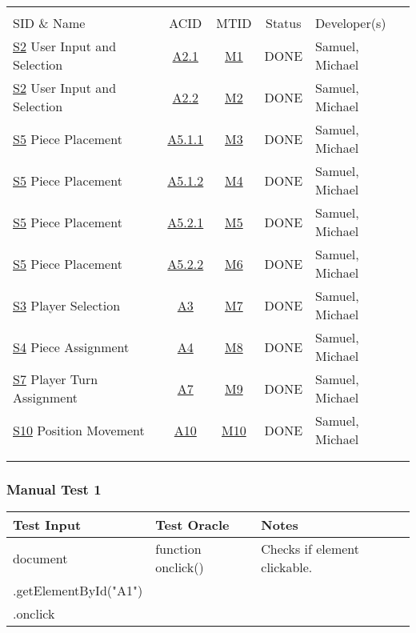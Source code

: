 \documentclass[11pt]{article}
\begin{document}
\begin{center}
\begin{tabular}{|p{4.5cm}|c|c|c|p{3.0cm}|}
 &  &  &  & \\
SID \& Name & ACID & MTID & Status & Developer(s)\\
\hline
\hyperref[sec:org85871bb]{S2} User Input and Selection & \hyperref[sec:orgf5fa540]{A2.1} & \hyperref[sec:orge680701]{M1} & DONE & Samuel, Michael\\
\hyperref[sec:org85871bb]{S2} User Input and Selection & \hyperref[sec:orgf5fa540]{A2.2} & \hyperref[sec:orga26eab6]{M2} & DONE & Samuel, Michael\\
\hyperref[sec:orgdbe2eb7]{S5} Piece Placement & \hyperref[sec:org7397a1b]{A5.1.1} & \hyperref[sec:orgd3f013d]{M3} & DONE & Samuel, Michael\\
\hyperref[sec:orgdbe2eb7]{S5} Piece Placement & \hyperref[sec:org7397a1b]{A5.1.2} & \hyperref[sec:org28f0264]{M4} & DONE & Samuel, Michael\\
\hyperref[sec:orgdbe2eb7]{S5} Piece Placement & \hyperref[sec:org7397a1b]{A5.2.1} & \hyperref[sec:orgcc2fdc0]{M5} & DONE & Samuel, Michael\\
\hyperref[sec:orgdbe2eb7]{S5} Piece Placement & \hyperref[sec:org7397a1b]{A5.2.2} & \hyperref[sec:orgf6e9b19]{M6} & DONE & Samuel, Michael\\
\hyperref[sec:org6661b71]{S3} Player Selection & \hyperref[sec:orgeafb96c]{A3} & \hyperref[sec:org2c6ba93]{M7} & DONE & Samuel, Michael\\
\hyperref[sec:org47fb86d]{S4} Piece Assignment & \hyperref[sec:org421b2d5]{A4} & \hyperref[sec:org76246c2]{M8} & DONE & Samuel, Michael\\
\hyperref[sec:orgf5d0825]{S7} Player Turn Assignment & \hyperref[sec:org6347978]{A7} & \hyperref[sec:orgdfb2713]{M9} & DONE & Samuel, Michael\\
\hyperref[sec:org63225c5]{S10} Position Movement & \hyperref[sec:org8c4c34f]{A10} & \hyperref[sec:orgf6b4157]{M10} & DONE & Samuel, Michael\\
 &  &  &  & \\
 &  &  &  & \\
\end{tabular}
\end{center}
\subsubsection{Manual Test 1}
\label{sec:orge680701}
\begin{center}
\begin{tabular}{|p{6.0cm}|p{4.0cm}|p{3.0cm}|}
Test Input & Test Oracle & Notes\\
\hline
document & function onclick() & Checks if element clickable.\\
.getElementById("A1") &  & \\
.onclick &  & \\
\end{tabular}
\end{center}
\end{document}
